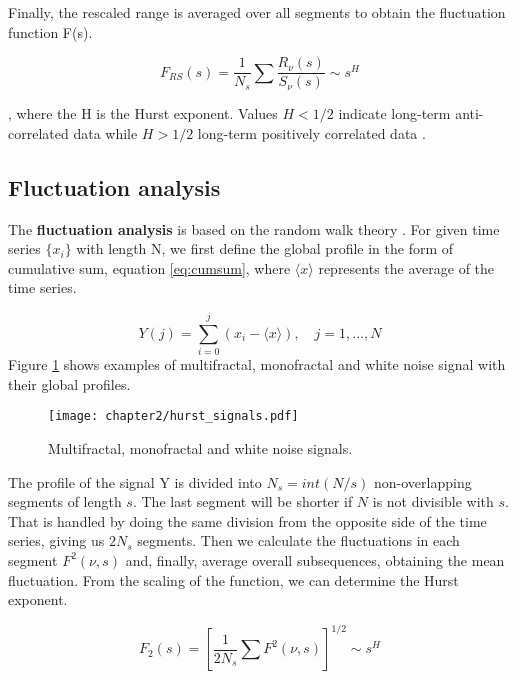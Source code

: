 Finally, the rescaled range is averaged over all segments to obtain the fluctuation function F(s).

$$F_{RS}(s) = \frac{1}{N_s}\sum \frac{R_{\nu}(s)}{S_{\nu}(s)} \sim s^H$$

, where the H is the Hurst exponent. Values $H<1/2$ indicate long-term anti-correlated data while $H>1/2$ long-term positively correlated data \cite{kantelhardt2008fractal}. 

\subsection{Fluctuation analysis}

The \textbf{fluctuation analysis} is based on the random walk theory \cite{kantelhardt2008fractal}. For given time series $\{x_i\}$ with length N, we first define the global profile in the form of cumulative sum, equation \ref{eq:cumsum}, where $\langle x\rangle $ represents the average of the time series. 

\begin{equation}
Y(j) = \sum_{i=0} ^j (x_i - \langle x\rangle), \quad j=1, ..., N
\label{eq:cumsum}
\end{equation}
Figure \ref{fig:hurst_signals} shows examples of multifractal, monofractal and white noise signal with their global profiles.

\begin{figure}[h]
	\centering
	\texttt{[image: chapter2/hurst\_signals.pdf]}
	\caption{Multifractal, monofractal and white noise signals.}
	\label{fig:hurst_signals}
\end{figure}

The profile of the signal Y is divided into $N_s = int (N/s)$ non-overlapping segments of length $s$. The last segment will be shorter if $N$ is not divisible with $s$. That is handled by doing the same division from the opposite side of the time series, giving us $2N_s$ segments. Then we calculate the fluctuations in each segment $F^2(\nu, s)$ and, finally, average overall subsequences, obtaining the mean fluctuation. From the scaling of the function, we can determine the Hurst exponent. 

\begin{equation}
F_2(s) = [\frac{1}{2N_s} \sum F^2(\nu,s)]^{1/2}  \sim s^H
\end{equation} 

